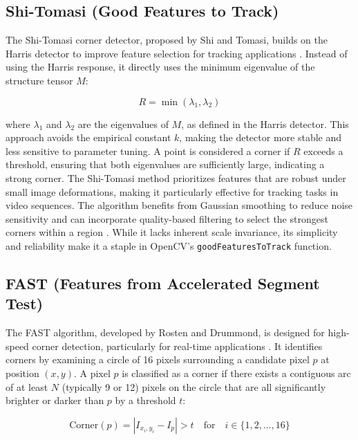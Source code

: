 \documentclass[journal]{IEEEtran}
\begin{document}
\subsection{Shi-Tomasi (Good Features to Track)}
The Shi-Tomasi corner detector, proposed by Shi and Tomasi, builds on the Harris detector to improve feature selection for tracking applications \cite{Shi_Tomasi}. Instead of using the Harris response, it directly uses the minimum eigenvalue of the structure tensor \( M \):

\begin{equation}
R = \min(\lambda_1, \lambda_2)
\end{equation}

where \( \lambda_1 \) and \( \lambda_2 \) are the eigenvalues of \( M \), as defined in the Harris detector. This approach avoids the empirical constant \( k \), making the detector more stable and less sensitive to parameter tuning. A point is considered a corner if \( R \) exceeds a threshold, ensuring that both eigenvalues are sufficiently large, indicating a strong corner. The Shi-Tomasi method prioritizes features that are robust under small image deformations, making it particularly effective for tracking tasks in video sequences. The algorithm benefits from Gaussian smoothing to reduce noise sensitivity and can incorporate quality-based filtering to select the strongest corners within a region \cite{Shi_Tomasi}. While it lacks inherent scale invariance, its simplicity and reliability make it a staple in OpenCV’s \texttt{goodFeaturesToTrack} function.\\

\subsection{FAST (Features from Accelerated Segment Test)}
The FAST algorithm, developed by Rosten and Drummond, is designed for high-speed corner detection, particularly for real-time applications \cite{FAST}. It identifies corners by examining a circle of 16 pixels surrounding a candidate pixel \( p \) at position \( (x, y) \). A pixel \( p \) is classified as a corner if there exists a contiguous arc of at least \( N \) (typically 9 or 12) pixels on the circle that are all significantly brighter or darker than \( p \) by a threshold \( t \):

\begin{equation}
\text{Corner}(p) = \left| I_{x_i, y_i} - I_p \right| > t \quad \text{for} \quad i \in \{1, 2, \ldots, 16\}
\end{equation}
\end{document}
